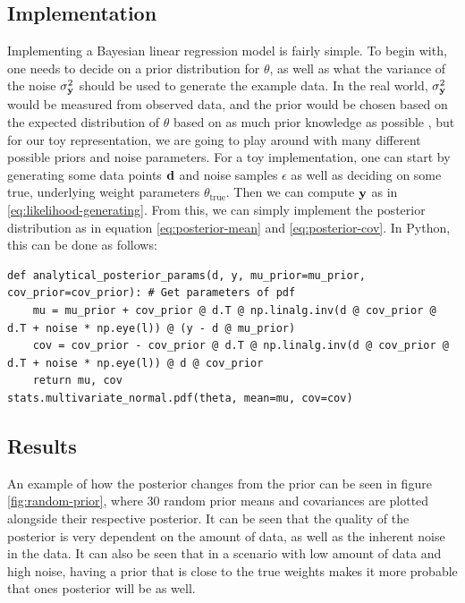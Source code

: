 \subsection{Implementation}
Implementing a Bayesian linear regression model is fairly simple.
To begin with, one needs to decide on a prior distribution for $\theta$, as well as what the variance of the noise $\sigma^2_{\mathbf{y}}$ should be used to generate the example data.
In the real world, $\sigma^2_{\mathbf{y}}$ would be measured from observed data, and the prior would be chosen based on the expected distribution of $\theta$ based on as much prior knowledge as possible
, but for our toy representation, we are going to play around with many different possible priors and noise parameters.
For a toy implementation, one can start by generating some data points $\mathbf{d}$ and noise samples $\epsilon$ as well as deciding on some true, underlying weight parameters $\theta_{\textrm{true}}$.
Then we can compute $\mathbf{y}$ as in \eqref{eq:likelihood-generating}. 
From this, we can simply implement the posterior distribution as in equation \ref{eq:posterior-mean} and \ref{eq:posterior-cov}.
In Python, this can be done as follows:
\begin{verbatim}
def analytical_posterior_params(d, y, mu_prior=mu_prior, cov_prior=cov_prior): # Get parameters of pdf
    mu = mu_prior + cov_prior @ d.T @ np.linalg.inv(d @ cov_prior @ d.T + noise * np.eye(l)) @ (y - d @ mu_prior)
    cov = cov_prior - cov_prior @ d.T @ np.linalg.inv(d @ cov_prior @ d.T + noise * np.eye(l)) @ d @ cov_prior
    return mu, cov
stats.multivariate_normal.pdf(theta, mean=mu, cov=cov)
\end{verbatim}

\subsection{Results}
An example of how the posterior changes from the prior can be seen in figure \ref{fig:random-prior}, where 30 random prior means and covariances are plotted alongside their respective posterior.
It can be seen that the quality of the posterior is very dependent on the amount of data, as well as the inherent noise in the data.
It can also be seen that in a scenario with low amount of data and high noise, having a prior that is close to the true weights makes it more probable that ones posterior will be as well.

